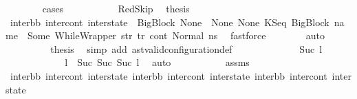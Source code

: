 \begin{isabellebody}
\ \ \ \ \ \ \isamarkupfalse%
\ cases\ \isanewline
\ \ \ \ \ \ \ \ \isamarkupfalse%
\ RedSkip\ \isamarkupfalse%
\ {\isacharquery}{\kern0pt}thesis\ \ \isamarkupfalse%
\ {\isacartoucheopen}{\isacharparenleft}{\kern0pt}inter{\isacharunderscore}{\kern0pt}bb{\isacharcomma}{\kern0pt}\ inter{\isacharunderscore}{\kern0pt}cont{\isacharcomma}{\kern0pt}\ inter{\isacharunderscore}{\kern0pt}state{\isacharparenright}{\kern0pt}\ {\isacharequal}{\kern0pt}\ {\isacharparenleft}{\kern0pt}BigBlock\ None\ {\isacharbrackleft}{\kern0pt}{\isacharbrackright}{\kern0pt}\ None\ None{\isacharcomma}{\kern0pt}\ {\isacharparenleft}{\kern0pt}KSeq\ {\isacharparenleft}{\kern0pt}BigBlock\ name\ {\isacharbrackleft}{\kern0pt}{\isacharbrackright}{\kern0pt}\ {\isacharparenleft}{\kern0pt}Some\ {\isacharparenleft}{\kern0pt}WhileWrapper\ str{\isacharparenright}{\kern0pt}{\isacharparenright}{\kern0pt}\ tr{\isacharparenright}{\kern0pt}\ cont{}{\isacharparenright}{\kern0pt}{\isacharcomma}{\kern0pt}\ Normal\ ns{}{\isacharparenright}{\kern0pt}{\isacartoucheclose}\ \isamarkupfalse%
\ fastforce\isanewline
\ \ \ \ \ \ \isamarkupfalse%
\ auto\isanewline
\ \ \ \ \ \ \isamarkupfalse%
\ \isamarkupfalse%
\ {\isacharquery}{\kern0pt}thesis\ \isamarkupfalse%
\ {\isacharparenleft}{\kern0pt}simp\ add{\isacharcolon}{\kern0pt}\ ast{\isacharunderscore}{\kern0pt}valid{\isacharunderscore}{\kern0pt}configuration{\isacharunderscore}{\kern0pt}def{\isacharparenright}{\kern0pt}\isanewline
\ \ \ \ \isamarkupfalse%
\isanewline
\ \ \ \ \ \ \isamarkupfalse%
\ {}{\isacharcolon}{\kern0pt}\ {\isacharparenleft}{\kern0pt}Suc\ l{}{\isacharparenright}{\kern0pt}\isanewline
\ \ \ \ \ \ \isamarkupfalse%
\ {}\ {}\ {}\ \isamarkupfalse%
\ {\isachardoublequoteopen}l\ {\isacharequal}{\kern0pt}\ Suc\ {\isacharparenleft}{\kern0pt}Suc\ {\isacharparenleft}{\kern0pt}Suc\ l{}{\isacharparenright}{\kern0pt}{\isacharparenright}{\kern0pt}{\isachardoublequoteclose}\ \isamarkupfalse%
\ auto\isanewline
\ \ \ \ \ \ \isamarkupfalse%
\ {}\ {}\ {}\ assms\ \isamarkupfalse%
\ inter{\isacharunderscore}{\kern0pt}bb\ inter{\isacharunderscore}{\kern0pt}cont\ inter{\isacharunderscore}{\kern0pt}state\ inter{\isacharunderscore}{\kern0pt}bb{}\ inter{\isacharunderscore}{\kern0pt}cont{}\ inter{\isacharunderscore}{\kern0pt}state{}\ inter{\isacharunderscore}{\kern0pt}bb{}\ inter{\isacharunderscore}{\kern0pt}cont{}\ inter{\isacharunderscore}{\kern0pt}state{}\ \isanewline

\end{isabellebody}

